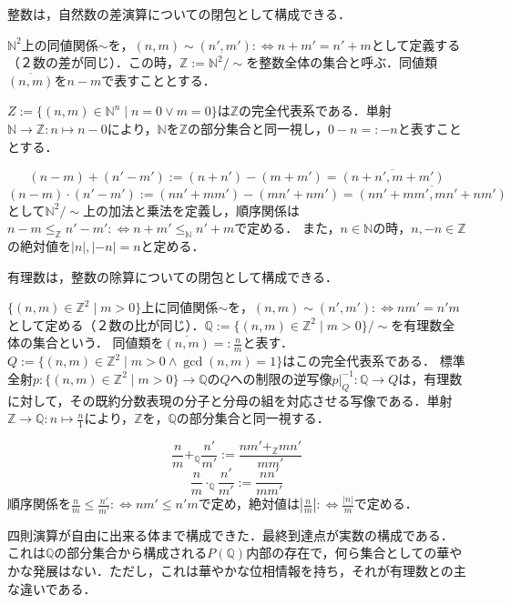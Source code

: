 \documentclass[uplatex, 12pt, dvipdfmx]{jsreport}
\begin{document}
整数は，自然数の差演算についての閉包として構成できる．
\begin{definition}[Integers]
    $\mathbb{N}^2$上の同値関係$\sim$を，$(n,m)\sim (n',m'):\Leftrightarrow n+m'=n'+m$として定義する（２数の差が同じ）．この時，$\mathbb{Z}:=\mathbb{N}^2/\sim$を整数全体の集合と呼ぶ．同値類$\overline{(n,m)}$を$n-m$で表すこととする．

    $Z:=\{(n,m)\in\mathbb{N}^n\mid n=0\lor m=0\}$は$\mathbb{Z}$の完全代表系である．単射$\mathbb{N}\to\mathbb{Z}:n\mapsto n-0$により，$\mathbb{N}$を$\mathbb{Z}$の部分集合と同一視し，$0-n=:-n$と表すこととする．
\end{definition}

\begin{definition}
    \[ (n-m)+(n'-m'):= (n+n')-(m+m')=\overline{(n+n',m+m')} \]
    \[ (n-m)\cdot (n'-m'):=(nn'+mm')-(mn'+nm')=\overline{(nn'+mm',mn'+nm')} \]
    として$\mathbb{N}^2/\sim$上の加法と乗法を定義し，順序関係は$n-m\le_\mathbb{Z} n'-m' :\Leftrightarrow n+m'\le_\mathbb{N} n'+m$で定める．
    また，$n\in\mathbb{N}$の時，$n,-n\in\mathbb{Z}$の絶対値を$|n|,|-n|=n$と定める．
\end{definition}

有理数は，整数の除算についての閉包として構成できる．
\begin{definition}
    $\{ (n,m)\in\mathbb{Z}^2\mid m>0 \}$上に同値関係$\sim$を，$(n,m)\sim (n',m'):\Leftrightarrow nm'=n'm$として定める（２数の比が同じ）．$\mathbb{Q}:=\{ (n,m)\in\mathbb{Z}^2\mid m>0 \}/\sim$を有理数全体の集合という．
    同値類を$\overline{(n,m)}=:\frac{n}{m}$と表す．$Q:=\{(n,m)\in\mathbb{Z}^2\mid m>0\land \gcd(n,m)=1\}$はこの完全代表系である．
    標準全射$p:\{ (n,m)\in\mathbb{Z}^2\mid m>0 \}\to\mathbb{Q}$の$Q$への制限の逆写像$p|_Q^{-1}:\mathbb{Q}\to Q$は，有理数に対して，その既約分数表現の分子と分母の組を対応させる写像である．単射$\mathbb{Z}\to\mathbb{Q}:n\mapsto\frac{n}{1}$により，$\mathbb{Z}$を，$\mathbb{Q}$の部分集合と同一視する．
\end{definition}

\begin{definition}
    \[ \frac{n}{m} +_\mathbb{Q} \frac{n'}{m'} := \frac{nm'+_\mathbb{Z}mn'}{mm'} \]
    \[ \frac{n}{m}\cdot_\mathbb{Q}\frac{n'}{m'} := \frac{nn'}{mm'} \]
    順序関係を$\frac{n}{m}\le\frac{n'}{m'}:\Leftrightarrow nm'\le n'm$で定め，絶対値は$\left| \frac{n}{m} \right|:\Leftrightarrow \frac{|n|}{m}$で定める．
\end{definition}
四則演算が自由に出来る体まで構成できた．最終到達点が実数の構成である．
これは$\mathbb{Q}$の部分集合から構成される$P(\mathbb{Q})$内部の存在で，何ら集合としての華やかな発展はない．ただし，これは華やかな位相情報を持ち，それが有理数との主な違いである．
\end{document}
